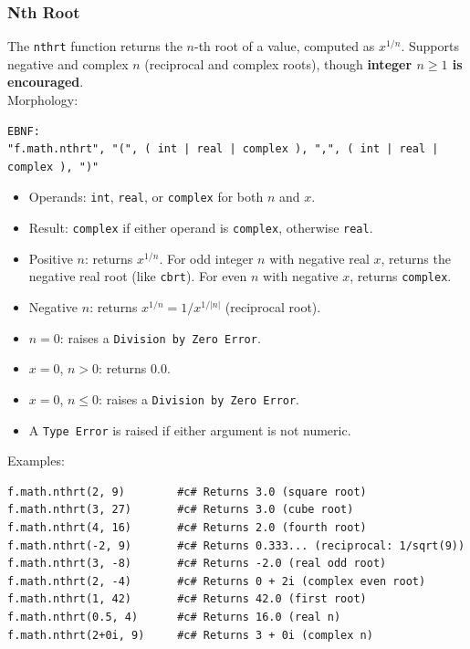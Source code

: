 \subsubsection{Nth Root}
The \texttt{nthrt} function returns the $n$-th root of a value, computed as $x^{1/n}$. Supports negative and complex $n$ (reciprocal and complex roots), though \textbf{integer $n \geq 1$ is encouraged}.\\
Morphology:
\begin{verbatim}
EBNF:
"f.math.nthrt", "(", ( int | real | complex ), ",", ( int | real | complex ), ")"
\end{verbatim}
\begin{itemize}
\item Operands: \texttt{int}, \texttt{real}, or \texttt{complex} for both $n$ and $x$.
\item Result: \texttt{complex} if either operand is \texttt{complex}, otherwise \texttt{real}.
\item Positive $n$: returns $x^{1/n}$. For odd integer $n$ with negative real $x$, returns the negative real root (like \texttt{cbrt}). For even $n$ with negative $x$, returns \texttt{complex}.
\item Negative $n$: returns $x^{1/n} = 1 / x^{1/|n|}$ (reciprocal root).
\item $n = 0$: raises a \texttt{Division by Zero Error}.
\item $x = 0$, $n > 0$: returns $0.0$.
\item $x = 0$, $n \leq 0$: raises a \texttt{Division by Zero Error}.
\item A \texttt{Type Error} is raised if either argument is not numeric.
\end{itemize}
Examples:
\begin{verbatim}
f.math.nthrt(2, 9)        #c# Returns 3.0 (square root)
f.math.nthrt(3, 27)       #c# Returns 3.0 (cube root)
f.math.nthrt(4, 16)       #c# Returns 2.0 (fourth root)
f.math.nthrt(-2, 9)       #c# Returns 0.333... (reciprocal: 1/sqrt(9))
f.math.nthrt(3, -8)       #c# Returns -2.0 (real odd root)
f.math.nthrt(2, -4)       #c# Returns 0 + 2i (complex even root)
f.math.nthrt(1, 42)       #c# Returns 42.0 (first root)
f.math.nthrt(0.5, 4)      #c# Returns 16.0 (real n)
f.math.nthrt(2+0i, 9)     #c# Returns 3 + 0i (complex n)
\end{verbatim}

